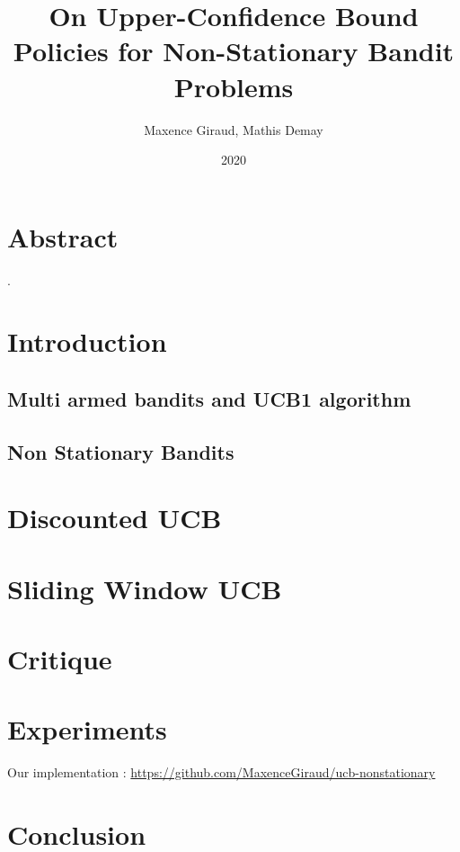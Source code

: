 \documentclass{article}
\title{On Upper-Confidence Bound Policies for Non-Stationary Bandit Problems}
\author{Maxence Giraud, Mathis Demay}
\date{2020}
\begin{document}
\maketitle

\section*{Abstract}
\cite{garivier2008upperconfidence}.

\section{Introduction}

\subsection{Multi armed bandits and UCB1 algorithm}

\subsection{Non Stationary Bandits}

\section{Discounted UCB}

\section{Sliding Window UCB}

\section{Critique}

\section{Experiments}
Our implementation : \url{https://github.com/MaxenceGiraud/ucb-nonstationary} 

\section{Conclusion}


\end{document}

